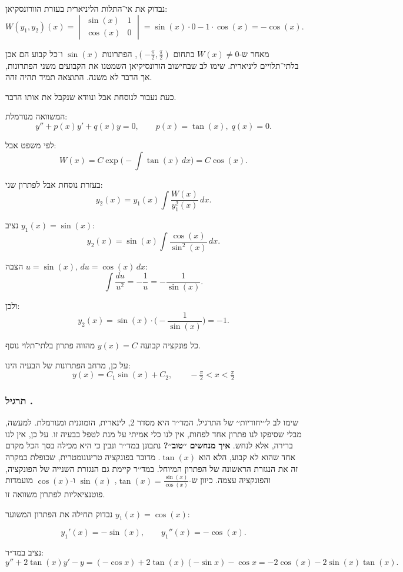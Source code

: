 \documentclass{article}
\numberwithin{equation}{section}
\newcounter{solution}[section]
\renewcommand{\thesolution}{\thesection.\arabic{solution}}
\newcommand{\solution}{%
  \refstepcounter{solution}%
  \subsubsection*{תרגיל \thesolution}%
  \label{sol:\thesolution}%
}
\begin{document}
נבדוק את אי־התלות הליניארית בעזרת הוורונסקיאן:  
\[
W(y_1,y_2)(x) =
\begin{vmatrix}
\sin(x) & 1 \\
\cos(x) & 0
\end{vmatrix}
= \sin(x)\cdot 0 - 1\cdot \cos(x) = -\cos(x).
\]

מאחר ש-$W(x)\neq 0$ בתחום $(-\tfrac{\pi}{2},\tfrac{\pi}{2})$, הפתרונות $\sin(x)$ ו־כל קבוע הם אכן בלתי־תלויים ליניארית. שימו לב שבחישוב הורונסיקיאן השמטנו את הקבועים משני הפתרונות, אך הדבר לא משנה. התוצאה תמיד תהיה זהה.

כעת נעבור לנוסחת אבל ונוודא שנקבל את אותו הדבר. 

המשוואה מנורמלת:
\[
y''+p(x)y'+q(x)y=0, \qquad p(x)=\tan(x), \; q(x)=0.
\]

לפי משפט אבל:
\[
W(x)=C\exp\!\Big(-\int \tan(x)\,dx\Big)=C\cos(x).
\]

בעזרת נוסחת אבל לפתרון שני:
\[
y_2(x)=y_1(x)\int \frac{W(x)}{y_1^2(x)}\,dx.
\]

נציב $y_1(x)=\sin(x)$:
\[
y_2(x)=\sin(x)\int \frac{\cos(x)}{\sin^2(x)}\,dx.
\]

הצבה $u=\sin(x),\,du=\cos(x)\,dx$:
\[
\int \frac{du}{u^2}=-\frac{1}{u}=-\frac{1}{\sin(x)}.
\]

ולכן:
\[
y_2(x)=\sin(x)\cdot\Big(-\frac{1}{\sin(x)}\Big)=-1.
\]

כל פונקציה קבועה $y(x)=C$ מהווה פתרון בלתי־תלוי נוסף.

על כן, מרחב הפתרונות של הבעיה הינו:
\[
\boxed{y(x)=C_1\sin(x)+C_2, \qquad -\tfrac{\pi}{2}<x<\tfrac{\pi}{2}}
\]

\solution{}

שימו לב ל׳׳יחודיות׳׳ של התרגיל. המד׳׳ר היא מסדר 2, לינארית, הומוגנית ומנורמלת. למעשה, מבלי שסיפקו לנו פתרון אחד לפחות, אין לנו כלי אמיתי על מנת לטפל בבעיה זו. על כן, אין לנו ברירה, אלא לנחש. \textbf{איך מנחשים ׳׳טוב׳׳?} נתבונן במד׳׳ר ונבין כי היא מכילה בסך הכל מקדם אחד שהוא לא קבוע, הלא הוא $\tan(x)$. מדובר בפונקציה טריגונומטרית, שכופלת במקרה זה את הנגזרת הראשונה של הפתרון המיוחל. במד׳׳ר קיימת גם הנגזרת השנייה של הפונקציה, והפונקציה עצמה. כיוון ש-$\tan(x)=\frac{\sin(x)}{\cos(x)}$, $\sin(x)$ ו-$\cos(x)$ מועמדות פוטנציאליות לפתרון משוואה זו.

נבדוק תחילה את הפתרון המשוער \(y_1(x) = \cos(x)\):

\[
y_1'(x) = -\sin(x), \qquad y_1''(x) = -\cos(x).
\]

נציב במד״ר:
\[
y'' + 2\tan(x)y' - y = (-\cos x) + 2\tan(x)(-\sin x) - \cos x 
= -2\cos(x) - 2\sin(x)\tan(x).
\]
\end{document}
